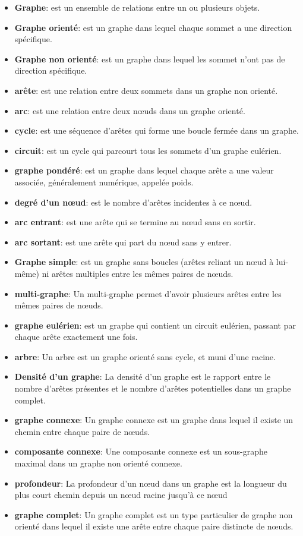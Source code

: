 \documentclass{report}
\begin{document}
\begin{itemize}
    \item{\textbf{Graphe}: est un ensemble de relations entre un ou plusieurs objets.}
    \item{\textbf{Graphe orienté}: est un graphe dans lequel chaque sommet a une direction spécifique.}
    \item{\textbf{Graphe non orienté}: est un graphe dans lequel les sommet n'ont pas de direction spécifique.}
    \item{\textbf{arête}: est une relation entre deux sommets dans un graphe non orienté.}
    \item{\textbf{arc}: est une relation entre deux nœuds dans un graphe orienté.}
    \item{\textbf{cycle}: est une séquence d'arêtes qui forme une boucle fermée dans un graphe.}
    \item{\textbf{circuit}: est un cycle qui parcourt tous les sommets d'un graphe eulérien.}
    \item{\textbf{graphe pondéré}: est un graphe dans lequel chaque arête a une valeur associée, généralement numérique, appelée poids.}
    \item{\textbf{degré d’un nœud}: est le nombre d'arêtes incidentes à ce nœud.}
    \item{\textbf{arc entrant}: est une arête qui se termine au nœud sans en sortir.}
    \item{\textbf{arc sortant}: est une arête qui part du nœud sans y entrer.}
    \item{\textbf{Graphe simple}: est un graphe sans boucles (arêtes reliant un nœud à lui-même) ni arêtes multiples entre les mêmes paires de nœuds.}
    \item{\textbf{multi-graphe}: Un multi-graphe permet d'avoir plusieurs arêtes entre les mêmes paires de nœuds.}
    \item{\textbf{graphe eulérien}: est un graphe qui contient un circuit eulérien, passant par chaque arête exactement une fois.}
    \item{\textbf{arbre}: Un arbre est un graphe orienté sans cycle, et muni d’une racine.}
    \item{\textbf{Densité d’un graphe}: La densité d'un graphe est le rapport entre le nombre d'arêtes présentes et le nombre d'arêtes potentielles dans un graphe complet.}
    \item{\textbf{graphe connexe}: Un graphe connexe est un graphe dans lequel il existe un chemin entre chaque paire de nœuds.}
    \item{\textbf{composante connexe}: Une composante connexe est un sous-graphe maximal dans un graphe non orienté connexe.}
    \item{\textbf{profondeur}:  La profondeur d'un nœud dans un graphe est la longueur du plus court chemin depuis un nœud racine jusqu'à ce nœud}
    \item{\textbf{graphe complet}: Un graphe complet est un type particulier de graphe non orienté dans lequel il existe une arête entre chaque paire distincte de nœuds.}
\end{itemize}
\end{document}
